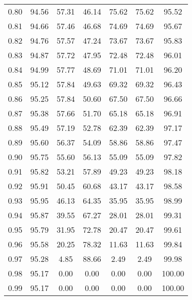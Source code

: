 \begin{tabular}{|c|c|c|c|c|c|c|}
      0.80 &     94.56 &     57.31 &      46.14 &   75.62 &      75.62 &         95.52 \\
      0.81 &     94.66 &     57.46 &      46.68 &   74.69 &      74.69 &         95.67 \\
      0.82 &     94.76 &     57.57 &      47.24 &   73.67 &      73.67 &         95.83 \\
      0.83 &     94.87 &     57.72 &      47.95 &   72.48 &      72.48 &         96.01 \\
      0.84 &     94.99 &     57.77 &      48.69 &   71.01 &      71.01 &         96.20 \\
      0.85 &     95.12 &     57.84 &      49.63 &   69.32 &      69.32 &         96.43 \\
      0.86 &     95.25 &     57.84 &      50.60 &   67.50 &      67.50 &         96.66 \\
      0.87 &     95.38 &     57.66 &      51.70 &   65.18 &      65.18 &         96.91 \\
      0.88 &     95.49 &     57.19 &      52.78 &   62.39 &      62.39 &         97.17 \\
      0.89 &     95.60 &     56.37 &      54.09 &   58.86 &      58.86 &         97.47 \\
      0.90 &     95.75 &     55.60 &      56.13 &   55.09 &      55.09 &         97.82 \\
      0.91 &     95.82 &     53.21 &      57.89 &   49.23 &      49.23 &         98.18 \\
      0.92 &     95.91 &     50.45 &      60.68 &   43.17 &      43.17 &         98.58 \\
      0.93 &     95.95 &     46.13 &      64.35 &   35.95 &      35.95 &         98.99 \\
      0.94 &     95.87 &     39.55 &      67.27 &   28.01 &      28.01 &         99.31 \\
      0.95 &     95.79 &     31.95 &      72.78 &   20.47 &      20.47 &         99.61 \\
      0.96 &     95.58 &     20.25 &      78.32 &   11.63 &      11.63 &         99.84 \\
      0.97 &     95.28 &      4.85 &      88.66 &    2.49 &       2.49 &         99.98 \\
      0.98 &     95.17 &      0.00 &       0.00 &    0.00 &       0.00 &        100.00 \\
      0.99 &     95.17 &      0.00 &       0.00 &    0.00 &       0.00 &        100.00 \\
\bottomrule
\end{tabular}

